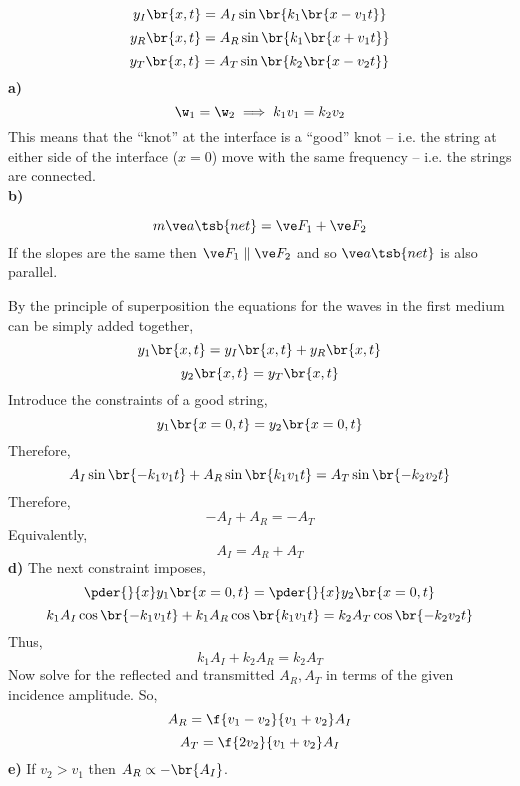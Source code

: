 \documentclass{article}
\begin{document}
\[ y_I\br{x,t} = A_I \sin \br{k_1 \br{x - v_1 t}} \]
\[ y_R\br{x,t} = A_R \sin \br{k_1 \br{x + v_1 t}} \]
\[ y_T\br{x,t} = A_T \sin \br{k_2 \br{x - v_2 t}} \]
\textbf{a)}
\[ \w_1 = \w_2 \implies k_1 v_1 = k_2 v_2 \]
This means that the ``knot'' at the interface is a ``good'' knot -- i.e. the string at either side of the interface ($x=0$) move with the same frequency -- i.e. the strings are connected.\\

\textbf{b)}

\begin{center}
\end{center}

\[ m \ve a\tsb{net} = \ve F_1 + \ve F_2 \]
If the slopes are the same then $\ve F_1 \parallel \ve F_2$ and so $\ve a\tsb{net}$ is also parallel.

\begin{center}
\end{center}
By the principle of superposition the equations for the waves in the first medium can be simply added together,
\[ y_1 \br{x,t} = y_I\br{x,t} + y_R\br{x,t} \]
\[ y_2 \br{x,t} = y_T\br{x,t} \]
Introduce the constraints of a good string,
\[ y_1\br{x=0, t} = y_2\br{x=0, t} \]
Therefore,
\[ A_I \sin\br{-k_1 v_1 t} + A_R \sin\br{k_1 v_1 t} = A_T \sin\br{-k_2 v_2 t} \]
Therefore,
\[ - A_I + A_R = - A_T \]
Equivalently,
\[ A_I = A_R + A_T \]
\textbf{d)}
The next constraint imposes,
\[ \pder{}{x}y_1\br{x=0, t} = \pder{}{x}y_2\br{x=0, t} \]
\[ k_1A_I \cos\br{-k_1 v_1 t} + k_1A_R \cos\br{k_1 v_1 t} = k_2A_T \cos\br{-k_2 v_2 t} \]
Thus,
\[ k_1 A_I + k_2 A_R = k_2 A_T \]
Now solve for the reflected and transmitted $A_R, A_T$ in terms of the given incidence amplitude. So,
\[ A_R = \f{v_1 - v_2}{v_1 + v_2} A_I \]
\[ A_T = \f{2v_2}{v_1 + v_2} A_I \]
\textbf{e)}
If $v_2 > v_1$ then $A_R \propto - \br{A_I}$.
\end{document}
